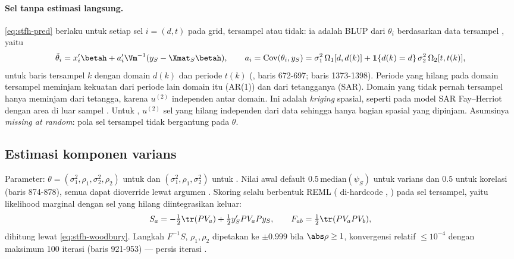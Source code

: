 \paragraph{Sel tanpa estimasi langsung.} \eqref{eq:stfh-pred} berlaku untuk
setiap sel $i=(d,t)$ pada grid, tersampel atau tidak: ia adalah BLUP dari
$\theta_i$ berdasarkan data tersampel \citep{saei2005out}, yaitu
\begin{equation}
  \tilde\theta_i=x_i'\betah+a_i'\Vm^{-1}(y_S-\Xmat_S\betah),\qquad
  a_i=\mathrm{Cov}(\theta_i,y_S)=\sigma_1^2\,\Omega_1[d,d(k)]
  +\mathbf 1\{d(k)=d\}\,\sigma_2^2\,\Omega_2[t,t(k)],
  \label{eq:stfh-blup}
\end{equation}
untuk baris tersampel $k$ dengan domain $d(k)$ dan periode $t(k)$
(, baris 672-697; baris 1373-1398). Periode yang hilang
pada domain tersampel meminjam kekuatan dari periode lain domain itu (AR(1))
dan dari tetangganya (SAR). Domain yang tidak pernah tersampel hanya
meminjam dari tetangga, karena $u^{(2)}$ independen antar domain. Ini adalah
\emph{kriging} spasial, seperti pada model SAR Fay--Herriot dengan area di
luar sampel \citep{benedetti2024handling}. Untuk , $u^{(2)}$
sel yang hilang independen dari data sehingga hanya bagian spasial yang
dipinjam. Asumsinya \emph{missing at random}: pola sel tersampel tidak
bergantung pada $\theta$.

\subsection{Estimasi komponen varians}\label{sec:stfh-varians}

Parameter: $\theta=(\sigma_1^2,\rho_1,\sigma_2^2,\rho_2)$ untuk
 dan $(\sigma_1^2,\rho_1,\sigma_2^2)$ untuk . Nilai awal
default $0.5\,\mathrm{median}(\psi_S)$ untuk varians dan $0.5$ untuk korelasi
(baris 874-878), semua dapat dioverride lewat argumen .
Skoring selalu berbentuk REML ( di-hardcode ,
) pada sel tersampel, yaitu likelihood marginal
dengan sel yang hilang diintegrasikan keluar:
\begin{equation}
  S_a=-\tfrac12\tr(P V_a)+\tfrac12 y_S'P V_a P y_S,
  \qquad
  F_{ab}=\tfrac12\tr(P V_a P V_b),
  \label{eq:stfh-score}
\end{equation}
dihitung lewat \eqref{eq:stfh-woodbury}. Langkah $F^{-1}S$, $\rho_1,\rho_2$
dipetakan ke $\pm0.999$ bila $\abs\rho\ge1$, konvergensi relatif $\le10^{-4}$
dengan maksimum 100 iterasi (baris 921-953) --- persis iterasi
.


